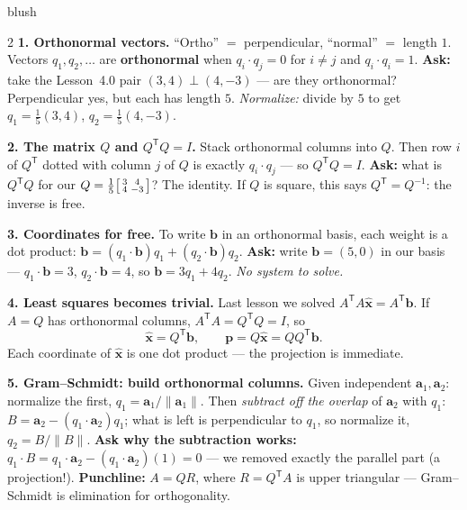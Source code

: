\documentclass[10pt]{article}
\newcommand{\xx}{\mathbf{x}}
\newcommand{\bb}{\mathbf{b}}
\newcommand{\pp}{\mathbf{p}}
\newcommand{\avec}{\mathbf{a}}
\newcommand{\T}{\mathsf{T}}
\begin{document}
\begin{skillbox}[Lesson]{blush}
\begin{multicols}{2}
\textbf{1. Orthonormal vectors.} ``Ortho'' $=$ perpendicular, ``normal'' $=$ length $1$. Vectors
$q_1,q_2,\dots$ are \textbf{orthonormal} when $q_i\cdot q_j=0$ for $i\ne j$ and $q_i\cdot q_i=1$.
\textbf{Ask:} take the Lesson~4.0 pair $(3,4)\perp(4,-3)$ --- are they orthonormal? Perpendicular yes, but
each has length $5$. \emph{Normalize:} divide by $5$ to get $q_1=\tfrac15(3,4)$, $q_2=\tfrac15(4,-3)$.

\textbf{2. The matrix $Q$ and $Q^{\T}Q=I$.} Stack orthonormal columns into $Q$. Then row $i$ of $Q^{\T}$
dotted with column $j$ of $Q$ is exactly $q_i\cdot q_j$ --- so $Q^{\T}Q=I$. \textbf{Ask:} what is $Q^{\T}Q$
for our $Q=\tfrac15\begin{bsmallmatrix}3&4\\4&-3\end{bsmallmatrix}$? The identity. If $Q$ is square, this
says $Q^{\T}=Q^{-1}$: the inverse is free.

\textbf{3. Coordinates for free.} To write $\bb$ in an orthonormal basis, each weight is a dot product:
$\bb=(q_1\cdot\bb)q_1+(q_2\cdot\bb)q_2$. \textbf{Ask:} write $\bb=(5,0)$ in our basis --- $q_1\cdot\bb=3$,
$q_2\cdot\bb=4$, so $\bb=3q_1+4q_2$. \emph{No system to solve.}

\columnbreak

\textbf{4. Least squares becomes trivial.} Last lesson we solved $A^{\T}A\hat{\xx}=A^{\T}\bb$. If $A=Q$ has
orthonormal columns, $A^{\T}A=Q^{\T}Q=I$, so
\[
  \hat{\xx}=Q^{\T}\bb,\qquad \pp=Q\hat{\xx}=QQ^{\T}\bb.
\]
Each coordinate of $\hat{\xx}$ is one dot product --- the projection is immediate.

\textbf{5. Gram--Schmidt: build orthonormal columns.} Given independent $\avec_1,\avec_2$: normalize the
first, $q_1=\avec_1/\|\avec_1\|$. Then \emph{subtract off the overlap} of $\avec_2$ with $q_1$:
$B=\avec_2-(q_1\cdot\avec_2)q_1$; what is left is perpendicular to $q_1$, so normalize it,
$q_2=B/\|B\|$. \textbf{Ask why the subtraction works:} $q_1\cdot B=q_1\cdot\avec_2-(q_1\cdot\avec_2)(1)=0$
--- we removed exactly the parallel part (a projection!). \textbf{Punchline:} $A=QR$, where $R=Q^{\T}A$ is
upper triangular --- Gram--Schmidt is elimination for orthogonality.
\end{multicols}
\end{skillbox}
\end{document}
